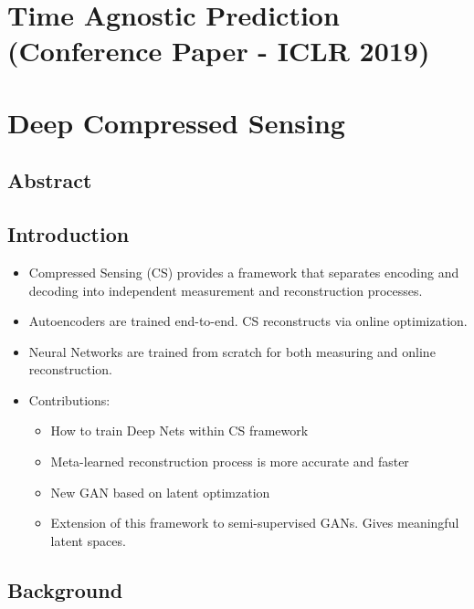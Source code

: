 \documentclass{article}
\begin{document}
    \section{Time Agnostic Prediction (Conference Paper - ICLR 2019)}\label{sec:Time_Agnostic_Prediction_(Conference_Paper_ICLR_2019)}

    \newpage


    \section{Deep Compressed Sensing}\label{sec:Deep_Compressed_Sensing}
    \subsection*{Abstract}

    \subsection{Introduction}\label{subsec:Deep_Compressed_Sensing:introduction}
    \begin{itemize}
        \item Compressed Sensing (CS) provides a framework that separates encoding and decoding into independent measurement and reconstruction processes.
        \item Autoencoders are trained end-to-end.
        CS reconstructs via online optimization.
        \item Neural Networks are trained from scratch for both measuring and online reconstruction.
        \item Contributions:
        \begin{itemize}
            \item How to train Deep Nets within CS framework
            \item Meta-learned reconstruction process is more accurate and faster
            \item New GAN based on latent optimzation
            \item Extension of this framework to semi-supervised GANs. Gives meaningful latent spaces.
        \end{itemize}
    \end{itemize}

    \subsection{Background}\label{subsec:Deep_Compressed_Sensing:background}
\end{document}
